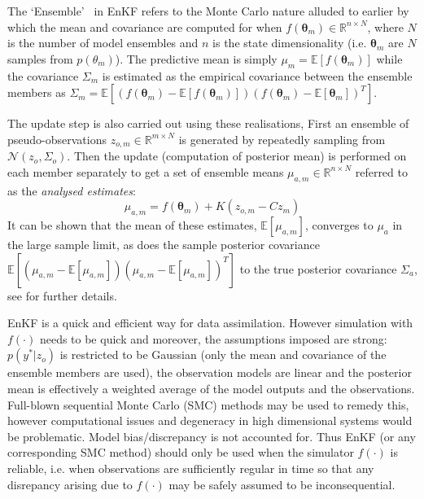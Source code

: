 \documentclass[10pt,a4paper]{article}
\newcommand{\expect} {{\mathbb{E}}}
\newcommand{\thetab} {{\boldsymbol{\theta}}}
\begin{document}
The \lq Ensemble\rq~ in EnKF refers to the Monte Carlo nature alluded to earlier by which the mean and covariance are computed for when $f(\thetab_m) \in \mathbb{R}^{n \times N}$, where $N$ is the number of model ensembles and $n$ is the state dimensionality (i.e. $\thetab_m$ are $N$ samples from $p(\theta_m)$). The predictive mean is simply $\mu_m = \expect[f(\thetab_m)]$ while the covariance $\Sigma_m$ is estimated as the empirical covariance between the ensemble members as  $\Sigma_m = \expect[(f(\thetab_m) - \expect[f(\thetab_m)])(f(\thetab_m) - \expect[\thetab_m])^T]$. 

The update step is also carried out using these realisations, First an ensemble of pseudo-observations $z_{o,m} \in \mathbb{R}^{m \times N}$ is generated by repeatedly sampling from $\mathcal{N}(z_o,\Sigma_o)$. Then the update (computation of posterior mean) is performed on each member separately to get a set of ensemble means $\mu_{a,m} \in \mathbb{R}^{n \times N}$ referred to as the \emph{analysed estimates}:
\begin{equation}
\mu_{a,m} = f(\thetab_m) + K(z_{o,m} - Cz_m)
\end{equation}
It can be shown that the mean of these estimates, $\expect[\mu_{a,m}]$, converges to $\mu_a$ in the large sample limit, as does the sample posterior covariance $\expect[(\mu_{a,m} - \expect[\mu_{a,m}])(\mu_{a,m} - \expect[\mu_{a,m}])^T]$ to the true posterior covariance $\Sigma_a$, see \cite{Burgers_1998} for further details.

EnKF is a quick and efficient way for data assimilation. However simulation with $f(\cdot)$ needs to be quick and moreover, the assumptions imposed are strong: $p(y^* | z_o)$ is restricted to be Gaussian (only the mean and covariance of the ensemble members are used), the observation models are linear and the posterior mean is effectively a weighted average of the model outputs and the observations. Full-blown sequential Monte Carlo (SMC) methods may be used to remedy this, however computational issues and degeneracy in high dimensional systems would be problematic. Model bias/discrepancy is not accounted for. Thus EnKF (or any corresponding SMC method) should only be used when the simulator $f(\cdot)$ is reliable, i.e. when observations are sufficiently regular in time so that any disrepancy arising due to $f(\cdot)$ may be safely assumed to be inconsequential.
\end{document}
